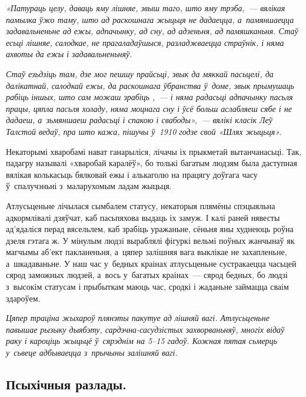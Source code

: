 \emph{«Патураць целу, даваць яму лішняе, звыш таго, што яму трэба,~--- вялікая памылка ўжо таму, што ад раскошнага жыцьця не дадаецца, а~памяншаецца задавальненьне ад ежы, адпачынку, ад сну, ад адзеньня, ад памяшканьня. Стаў есьці лішняе, салодкае, не прагаладаўшыся, разладжваецца страўнік, і няма ахвоты да ежы і задавальненьняў.}

\emph{Стаў езьдзіць там, дзе мог пешшу прайсьці, звык да мяккай пасьцелі, да далікатнай, салодкай ежы, да раскошнага ўбранства ў~доме, звык прымушаць рабіць іншых, што сам можаш зрабіць ,~--- і няма радасьці адпачынку пасьля працы, цяпла пасьля холаду, няма моцнага сну і ўсё больш аслабляеш сябе і не дадаеш, а~зьмяншаеш радасьці і спакою і свабоды»,~--- вялікі класік Леў Талстой ведаў, пра што кажа, пішучы ў~1910 годзе свой «Шлях жыцьця».}


Некаторымі хваробамі нават ганарыліся, лічачы іх прыкметай вытанчанасьці. Так, падагру называлі «хваробай каралёў», бо толькі багатым людзям была даступная вялікая колькасьць бялковай ежы і алькаголю на працягу доўгага часу ў~спалучэньні з~маларухомым ладам жыцьця.

Атлусьценьне лічылася сымбалем статусу, некаторыя плямёны спэцыяльна адкормлівалі дзяўчат, каб пасьпяхова выдаць іх замуж. І калі раней нявесты ад'ядаліся перад вясельлем, каб зрабіць уражаньне, сёньня яны худнеюць роўна дзеля гэтага ж. У мінулым людзі выраблялі фігуркі вельмі поўных жанчынаў як магчымы аб'ект пакланеньня, а~цяпер залішняя вага выклікае не захапленьне, а~шкадаваньне. У наш час у~бедных краінах атлусьценьне сустракаецца часьцей сярод заможных людзей, а~вось у~багатых краінах~--- сярод бедных, бо людзі з~высокім статусам і прыбыткам маюць час, сродкі і жаданьне займацца сваім здароўем.

\emph{Цяпер траціна жыхароў плянэты пакутуе ад лішняй вагі. Атлусьценьне павышае рызыку дыябэту, сардэчна-сасудзістых захворваньняў, многіх відаў раку і кароціць жыцьцё ў~сярэднім на 5--15 гадоў. Кожная пятая сьмерць у~сьвеце адбываецца з~прычыны залішняй вагі.}

\subsection*{Псыхічныя разлады.}

